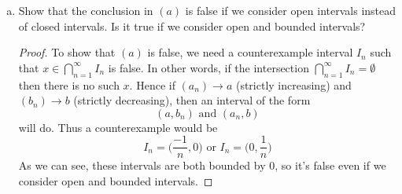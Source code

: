 \documentclass[10pt,letterpaper]{article}
\begin{document}
\begin{enumerate}[(a)]
	\item Show that the conclusion in $(a)$ is false if we consider open intervals instead of closed intervals. 
	Is it true if we consider open and bounded intervals?
	\begin{proof}
	To show that $(a)$ is false, we need a counterexample interval $I_n$ such that 
	$x \in \displaystyle\bigcap_{n=1}^{\infty} I_n$ is false. In other words,
	if the intersection $\displaystyle\bigcap_{n=1}^{\infty} I_n = \emptyset$ then
	there is no such $x$. Hence if $(a_n) \rightarrow a$ (strictly increasing) and $(b_n) \rightarrow b$ (strictly
	decreasing), then an interval of the form 
			$$(a, b_n) \text{ and } (a_n, b)$$
	will do. Thus a counterexample would be
	$$I_n = \bigg(\dfrac{-1}{n}, 0\bigg) \text{ or } I_n = \bigg(0, \dfrac{1}{n}\bigg)$$
	As we can see, these intervals are both bounded by 0, so it's false even if we consider open
	and bounded intervals.
	\end{proof}
	
	\end{enumerate}
	
\end{document}
